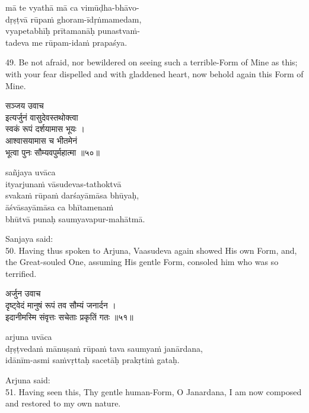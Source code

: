 \begin{transliteration}
mā te vyathā mā ca vimūḍha-bhāvo- \\
\tab dṛṣṭvā rūpaṁ ghoram-īdṛṅmamedam, \\
vyapetabhīḥ prītamanāḥ punastvaṁ- \\
\tab tadeva me rūpam-idaṁ prapaśya.
\end{transliteration}

49. Be not afraid, nor bewildered on seeing such a terrible-Form of Mine as
this; with your fear dispelled and with gladdened heart, now behold again this
Form of Mine.

\begin{gitaverse}
सञ्जय उवाच \\
इत्यर्जुनं वासुदेवस्तथोक्त्वा \\
\tab स्वकं रूपं दर्शयामास भूयः । \\
आश्वासयामास च भीतमेनं \\
\tab भूत्वा पुनः सौम्यवपुर्महात्मा ॥५०॥
\end{gitaverse}

\begin{transliteration}
sañjaya uvāca \\
ityarjunaṁ vāsudevas-tathoktvā \\
\tab svakaṁ rūpaṁ darśayāmāsa bhūyaḥ, \\
āśvāsayāmāsa ca bhītamenaṁ \\
\tab bhūtvā punaḥ saumyavapur-mahātmā.
\end{transliteration}

Sanjaya said: \\
50. Having thus spoken to Arjuna, Vaasudeva again showed His own Form, and, the
Great-souled One, assuming His gentle Form, consoled him who was so terrified.

\begin{gitaverse}
अर्जुन उवाच \\
दृष्ट्वेदं मानुषं रूपं तव सौम्यं जनार्दन । \\
इदानीमस्मि संवृत्तः सचेताः प्रकृतिं गतः ॥५१॥
\end{gitaverse}

\begin{transliteration}
arjuna uvāca \\
dṛṣṭvedaṁ mānuṣaṁ rūpaṁ tava saumyaṁ janārdana, \\
idānīm-asmi saṁvṛttaḥ sacetāḥ prakṛtiṁ gataḥ.
\end{transliteration}

Arjuna said: \\
51. Having seen this, Thy gentle human-Form, O Janardana, I am now composed and
restored to my own nature.

